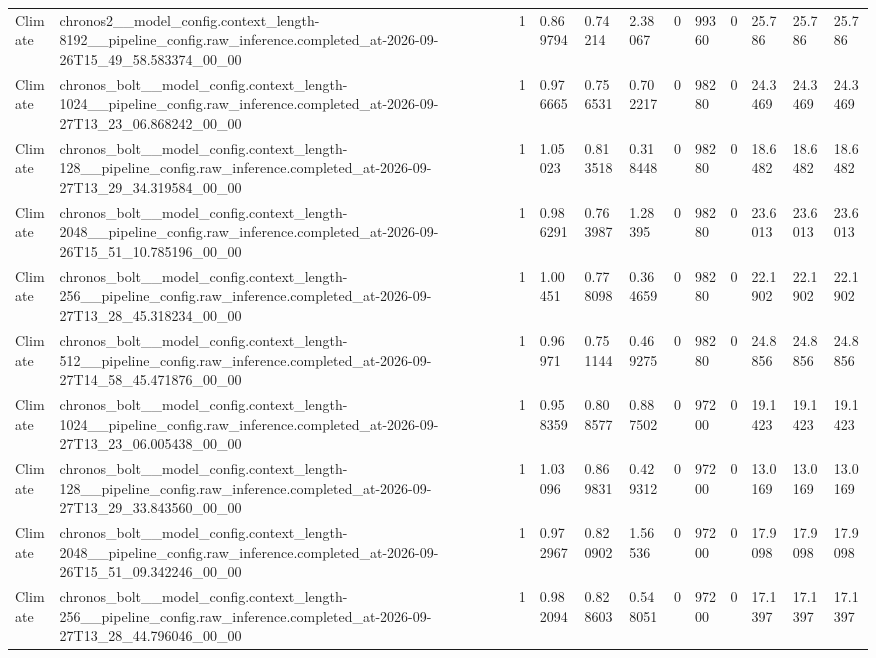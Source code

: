 \begin{tabular}{llllllllllll}
Climate & chronos2\_\_model\_config.context\_length-8192\_\_pipeline\_config.raw\_inference.completed\_at-2026-09-26T15\_49\_58.583374\_00\_00 & 1 & 0.869794 & 0.74214 & 2.38067 & 0 & 99360 & 0 & 25.786 & 25.786 & 25.786 \\
Climate & chronos\_bolt\_\_model\_config.context\_length-1024\_\_pipeline\_config.raw\_inference.completed\_at-2026-09-27T13\_23\_06.868242\_00\_00 & 1 & 0.976665 & 0.756531 & 0.702217 & 0 & 98280 & 0 & 24.3469 & 24.3469 & 24.3469 \\
Climate & chronos\_bolt\_\_model\_config.context\_length-128\_\_pipeline\_config.raw\_inference.completed\_at-2026-09-27T13\_29\_34.319584\_00\_00 & 1 & 1.05023 & 0.813518 & 0.318448 & 0 & 98280 & 0 & 18.6482 & 18.6482 & 18.6482 \\
Climate & chronos\_bolt\_\_model\_config.context\_length-2048\_\_pipeline\_config.raw\_inference.completed\_at-2026-09-26T15\_51\_10.785196\_00\_00 & 1 & 0.986291 & 0.763987 & 1.28395 & 0 & 98280 & 0 & 23.6013 & 23.6013 & 23.6013 \\
Climate & chronos\_bolt\_\_model\_config.context\_length-256\_\_pipeline\_config.raw\_inference.completed\_at-2026-09-27T13\_28\_45.318234\_00\_00 & 1 & 1.00451 & 0.778098 & 0.364659 & 0 & 98280 & 0 & 22.1902 & 22.1902 & 22.1902 \\
Climate & chronos\_bolt\_\_model\_config.context\_length-512\_\_pipeline\_config.raw\_inference.completed\_at-2026-09-27T14\_58\_45.471876\_00\_00 & 1 & 0.96971 & 0.751144 & 0.469275 & 0 & 98280 & 0 & 24.8856 & 24.8856 & 24.8856 \\
Climate & chronos\_bolt\_\_model\_config.context\_length-1024\_\_pipeline\_config.raw\_inference.completed\_at-2026-09-27T13\_23\_06.005438\_00\_00 & 1 & 0.958359 & 0.808577 & 0.887502 & 0 & 97200 & 0 & 19.1423 & 19.1423 & 19.1423 \\
Climate & chronos\_bolt\_\_model\_config.context\_length-128\_\_pipeline\_config.raw\_inference.completed\_at-2026-09-27T13\_29\_33.843560\_00\_00 & 1 & 1.03096 & 0.869831 & 0.429312 & 0 & 97200 & 0 & 13.0169 & 13.0169 & 13.0169 \\
Climate & chronos\_bolt\_\_model\_config.context\_length-2048\_\_pipeline\_config.raw\_inference.completed\_at-2026-09-26T15\_51\_09.342246\_00\_00 & 1 & 0.972967 & 0.820902 & 1.56536 & 0 & 97200 & 0 & 17.9098 & 17.9098 & 17.9098 \\
Climate & chronos\_bolt\_\_model\_config.context\_length-256\_\_pipeline\_config.raw\_inference.completed\_at-2026-09-27T13\_28\_44.796046\_00\_00 & 1 & 0.982094 & 0.828603 & 0.548051 & 0 & 97200 & 0 & 17.1397 & 17.1397 & 17.1397 \\

\end{tabular}
